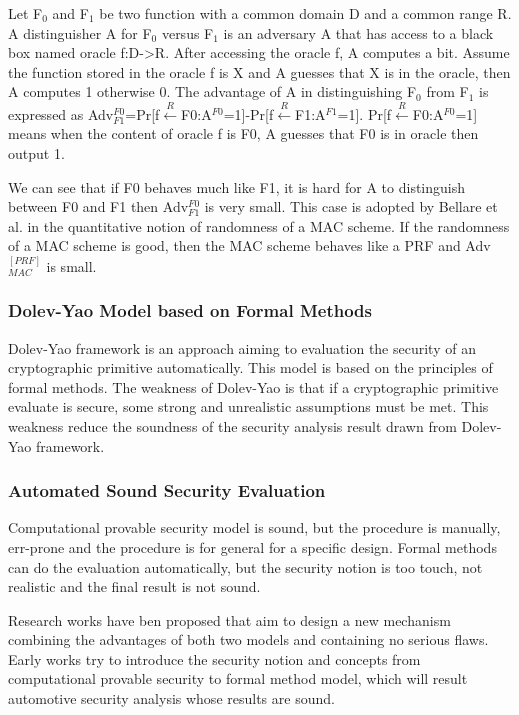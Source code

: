 \documentclass{article}
\begin{document}
Let F$_0$ and F$_1$ be two function with a common domain D and a common range R. A distinguisher A for F$_0$ versus F$_1$ is an adversary A that has access to a black box named oracle f:D->R. After accessing the oracle f, A computes a bit. Assume the function stored in the oracle f is X and A guesses that X is in the oracle, then A computes 1 otherwise 0. The advantage of A in distinguishing F$_0$ from F$_1$ is expressed as Adv$^{F0}_{F1}$=Pr[f$\stackrel{R}{\longleftarrow}$F0:A$^{F0}$=1]-Pr[f$\stackrel{R}{\longleftarrow}$F1:A$^{F1}$=1]. Pr[f$\stackrel{R}{\longleftarrow}$F0:A$^{F0}$=1] means when the content of oracle f is F0, A guesses that F0 is in oracle then output 1.

We can see that if F0 behaves much like F1, it is hard for A to distinguish between F0 and F1 then Adv$^{F0}_{F1}$ is very small. This case is adopted by Bellare et al. in the quantitative notion of randomness of a MAC scheme. If the randomness of a MAC scheme is good, then the MAC scheme behaves like a PRF and Adv$^{[PRF]}_{MAC}$ is small. 

\subsubsection{Dolev-Yao Model based on Formal Methods}
Dolev-Yao \cite{dolev-yao} framework is an approach aiming to evaluation the security of an cryptographic primitive automatically. This model is based on the principles of formal methods. 
The weakness of Dolev-Yao is that if a cryptographic primitive evaluate is secure, some strong and unrealistic assumptions must be met. This weakness reduce the soundness of the security analysis result drawn from Dolev-Yao framework.

\subsubsection{Automated Sound Security Evaluation}
Computational provable security model is sound, but the procedure is manually, err-prone and the procedure is for general for a specific design. 
Formal methods can do the evaluation automatically, but the security notion is too touch, not realistic and the final result is not sound.

Research works have ben proposed that aim to design a new mechanism combining the advantages of both two models and containing no serious flaws. Early works try to introduce the security notion and concepts from computational provable security to formal method model, which will result automotive security analysis whose results are sound.
\end{document}
